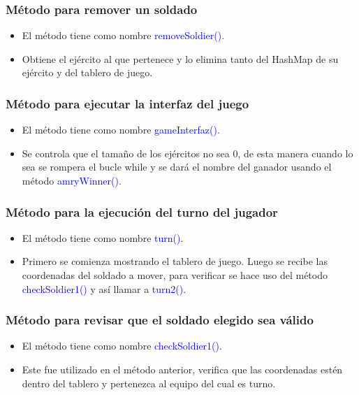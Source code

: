 \documentclass{article}
\begin{document}
\subsubsection{Método para remover un soldado}
\begin{itemize}
    \item El método tiene como nombre \textcolor{blue}{removeSoldier()}.
    \item Obtiene el ejército al que pertenece y lo elimina tanto del HashMap de su ejército y del tablero de juego.
\end{itemize}



\subsubsection{Método para ejecutar la interfaz del juego}
\begin{itemize}
    \item El método tiene como nombre \textcolor{blue}{gameInterfaz()}.
    \item Se controla que el tamaño de los ejércitos no sea 0, de esta manera cuando lo sea se rompera el bucle while y se dará el nombre del ganador usando el método \textcolor{blue}{amryWinner()}.
\end{itemize}



\subsubsection{Método para la ejecución del turno del jugador}
\begin{itemize}
    \item El método tiene como nombre \textcolor{blue}{turn()}.
    \item Primero se comienza mostrando el tablero de juego. Luego se recibe las coordenadas del soldado a mover, para verificar se hace uso del método \textcolor{blue}{checkSoldier1()} y así llamar a \textcolor{blue}{turn2()}.
\end{itemize}


\newpage

\subsubsection{Método para revisar que el soldado elegido sea válido}
\begin{itemize}
    \item El método tiene como nombre \textcolor{blue}{checkSoldier1()}.
    \item Este fue utilizado en el método anterior, verifica que las coordenadas estén dentro del tablero y pertenezca al equipo del cual es turno.
\end{itemize}

\end{document}
